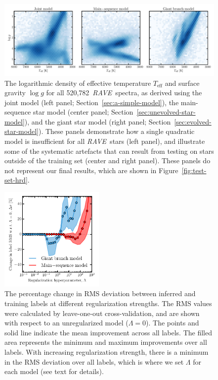 \documentclass[preprint,trackchanges]{aastex}
\newcommand{\acronym}[1]{{\small{#1}}}
\newcommand{\project}[1]{\textsl{#1}}
\newcommand{\rave}{\project{\acronym{RAVE}}}
\newcommand{\teff}{T_{\mathrm{eff}}}
\newcommand{\logg}{\log g}
\newcommand{\Nspectra}{520,782}
\begin{document}
\begin{figure}[p]
\includegraphics[width=\textwidth]{figures/test-set-density.pdf}
\caption{The logarithmic density of effective temperature $\teff$ and surface gravity $\logg$ for all \Nspectra\ \rave\ spectra, as derived using the joint model (left panel; Section~\ref{sec:a-simple-model}), the main-sequence star model (center panel; Section~\ref{sec:unevolved-star-model}), and the giant star model (right panel; Section~\ref{sec:evolved-star-model}). These panels demonstrate how a single quadratic model is insufficient for all \rave\ stars (left panel), and illustrate some of the systematic artefacts that can result from testing on stars outside of the training set (center and right panel).  These panels do not represent our final results, which are shown in Figure~\ref{fig:test-set-hrd}.\label{fig:test-set-density}}
\end{figure}


\begin{figure}[p]
\center
\includegraphics[width=0.45\textwidth]{figures/set-hyperparameters.pdf}
\caption{The percentage change in RMS deviation between inferred and training labels at different regularization strengths.  The RMS values were calculated by leave-one-out cross-validation, and are shown with respect to an unregularized model ($\Lambda = 0$).  The points and solid line indicate the mean improvement across all labels. The filled area represents the minimum and maximum improvements over all labels. With increasing regularization strength, there is a minimum in the RMS deviation over all labels, which is where we set $\Lambda$ for each model (see text for details).\label{fig:set-hyperparameters}}
\end{figure}
\end{document}
